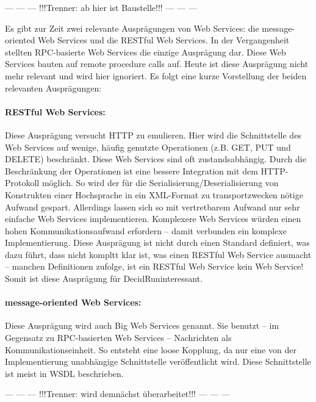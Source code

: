 \documentclass[runningheads]{llncs}
\newcommand{\germanquote}[1]{\glqq{}#1\grqq{}}
\newcommand{\decidr}{DecidR}
\begin{document}
   \begin{center}--- --- --- !!!Trenner: ab hier ist Baustelle!!! --- --- ---\end{center}

    Es gibt zur Zeit zwei relevante Ausprägungen von Web Services: die \germanquote{message-oriented Web Services} und die \germanquote{RESTful Web Services}. In der Vergangenheit stellten RPC-basierte Web Services die einzige Ausprägung dar. Diese Web Services bauten auf \germanquote{remote procedure calls} auf. Heute ist diese Ausprägung nicht mehr relevant und wird hier ignoriert. Es folgt eine kurze Vorstellung der beiden relevanten Ausprägungen:

    \paragraph{RESTful Web Services:}
      Diese Ausprägung versucht HTTP zu emulieren. Hier wird die Schnittstelle des Web Services auf wenige, häufig genutzte Operationen (z.B. GET, PUT und DELETE) beschränkt. Diese Web Services sind oft zustandsabhängig. Durch die Beschränkung der Operationen ist eine bessere Integration mit dem HTTP-Protokoll möglich. So wird der für die Serialisierung/Deserialisierung von Konstrukten einer Hochsprache in ein XML-Format zu transportzwecken nötige Aufwand gespart. Allerdings lassen sich so mit vertretbarem Aufwand nur sehr einfache Web Services implementieren. Komplexere Web Services würden einen hohen Kommunikationsaufwand erfordern -- damit verbunden ein komplexe Implementierung. Diese Ausprägung ist nicht durch einen Standard definiert, was dazu führt, dass nicht kompltt klar ist, was einen RESTful Web Service ausmacht -- manchen Definitionen zufolge, ist ein RESTful Web Service kein Web Service! Somit ist diese Ausprägung für \decidr uninteressant.

    \paragraph{message-oriented Web Services:}
      Diese Ausprägung wird auch \germanquote{Big Web Services} genannt. Sie benutzt -- im Gegensatz zu RPC-basierten Web Services -- Nachrichten als Kommunikationseinheit. So entsteht eine loose Kopplung, da nur eine von der Implementierung unabhängige Schnittstelle veröffentlicht wird. Diese Schnittstelle ist meist in WSDL beschrieben.

   \begin{center}--- --- --- !!!Trenner: wird demnächst überarbeitet!!! --- --- ---\end{center}
\end{document}
